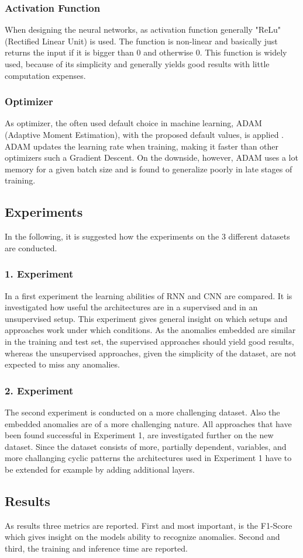 \subsubsection{Activation Function}
When designing the neural networks, as activation function generally "ReLu" (Rectified Linear Unit) is used. The function is non-linear and basically just returns the input if it is bigger than 0 and otherwise 0. This function is widely used, because of its simplicity and generally yields good results with little computation expenses.  

\subsubsection{Optimizer}
As optimizer, the often used default choice in machine learning, ADAM (Adaptive Moment Estimation), with the proposed default values, is applied \parencite{AUTHOR,YEAR}. ADAM updates the learning rate when training, making it faster than other optimizers such a Gradient Descent. On the downside, however, ADAM uses a lot memory for a given batch size and is found to generalize poorly in late stages of training.

\subsection{Experiments}
In the following, it is suggested how the experiments on the 3 different datasets are conducted.

\subsubsection{1. Experiment}
In a first experiment the learning abilities of RNN and CNN are compared. It is investigated how useful the architectures are in a supervised and in an unsupervised setup. This experiment gives general insight on which setups and approaches work under which conditions. As the anomalies embedded are similar in the training and test set, the supervised approaches should yield good results, whereas the unsupervised approaches, given the simplicity of the dataset, are not expected to miss any anomalies.

\subsubsection{2. Experiment}
The second experiment is conducted on a more challenging dataset. Also the embedded anomalies are of a more challenging nature. All approaches that have been found successful in Experiment 1, are investigated further on the new dataset. Since the dataset consists of more, partially dependent, variables, and more challanging cyclic patterns the architectures used in Experiment 1 have to be extended for example by adding additional layers. 

\subsection{Results}
As results three metrics are reported. First and most important, is the F1-Score which gives insight on the models ability to recognize anomalies. Second and third, the training and inference time are reported.



 